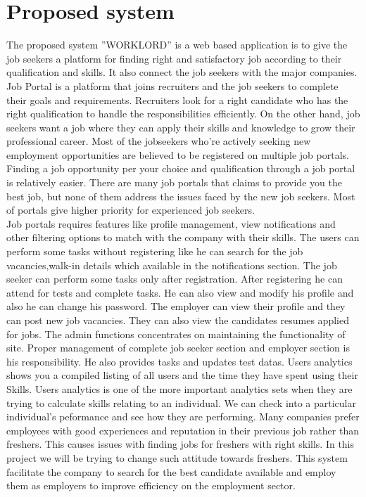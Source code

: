 \documentclass[a4paper,12pt]{report}
\begin{document}
\section{Proposed system}
\hspace*{12pt}
The proposed system ”WORKLORD” is a web based application is to give the job seekers a platform for finding right and satisfactory job according to their qualification and skills. It also connect the job seekers with the major companies. Job Portal is a platform that joins recruiters and the job seekers to complete their goals and requirements. Recruiters look for a right candidate who has the right qualification to handle the responsibilities efficiently. On the other  hand, job seekers want a job where they can apply their skills and knowledge to grow their professional career. Most of the jobseekers who're actively seeking new employment opportunities are believed to be registered on multiple job portals. Finding a job opportunity per your choice and qualification through a job portal is relatively easier. There are many job portals that claims to provide you the best job, but none of them address the issues faced by the new job seekers. Most of portals give higher priority for experienced job seekers.\\

Job portals requires features like profile management, view notifications and other filtering options to match with the company with their skills. The users can perform some tasks without registering like he can search for the job vacancies,walk-in details which available in the notifications section. The job seeker can perform some tasks only after registration. After registering he can attend for tests and complete tasks. He can also view and modify his profile and also he can change his password. The employer can view their profile and they can post new job vacancies. They can also view the candidates resumes applied for jobs. The admin functions concentrates on maintaining the functionality of site. Proper management of complete job seeker section and employer section is his responsibility. He also provides tasks and updates test datas. Users analytics shows you a compiled listing of all users and the time they have spent using their Skills. Users analytics is one of the more important analytics sets when they are trying to calculate skills relating to an individual. We can check into a particular individual's peformance and see how they are performing. Many companies prefer employees with good experiences and reputation in their previous job rather than freshers. This causes issues with finding jobs for freshers with right skills. In this project we will be trying to change such attitude towards freshers. This system facilitate the company to search for the best candidate available and employ them as employers to improve efficiency on the employment sector.\\
\end{document}
